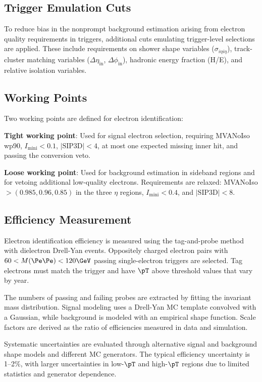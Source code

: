 \subsection{Trigger Emulation Cuts}

To reduce bias in the nonprompt background estimation arising from electron quality requirements in triggers, additional cuts emulating trigger-level selections are applied. These include requirements on shower shape variables ($\sigma_{i\eta i\eta}$), track-cluster matching variables ($\Delta\eta_{\text{in}}$, $\Delta\phi_{\text{in}}$), hadronic energy fraction (H/E), and relative isolation variables.

\subsection{Working Points}

Two working points are defined for electron identification:

\textbf{Tight working point}: Used for signal electron selection, requiring MVANoIso wp90, $I_{\text{mini}} < 0.1$, $|\text{SIP3D}| < 4$, at most one expected missing inner hit, and passing the conversion veto.

\textbf{Loose working point}: Used for background estimation in sideband regions and for vetoing additional low-quality electrons. Requirements are relaxed: MVANoIso $> (0.985, 0.96, 0.85)$ in the three $\eta$ regions, $I_{\text{mini}} < 0.4$, and $|\text{SIP3D}| < 8$.

\subsection{Efficiency Measurement}

Electron identification efficiency is measured using the tag-and-probe method with dielectron Drell-Yan events. Oppositely charged electron pairs with $60 < M(\Pe\Pe) < 120\GeV$ passing single-electron triggers are selected. Tag electrons must match the trigger and have $\pT$ above threshold values that vary by year.

The numbers of passing and failing probes are extracted by fitting the invariant mass distribution. Signal modeling uses a Drell-Yan MC template convolved with a Gaussian, while background is modeled with an empirical shape function. Scale factors are derived as the ratio of efficiencies measured in data and simulation.

Systematic uncertainties are evaluated through alternative signal and background shape models and different MC generators. The typical efficiency uncertainty is 1--2\%, with larger uncertainties in low-$\pT$ and high-$\pT$ regions due to limited statistics and generator dependence.


